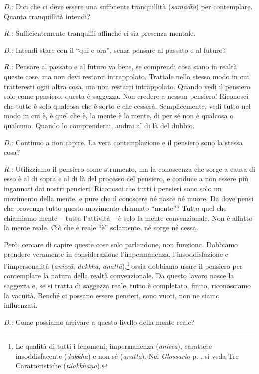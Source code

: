 \emph{D.:} Dici che ci deve essere una sufficiente tranquillità
(\emph{samādhi}) per contemplare. Quanta tranquillità intendi?

\emph{R.:} Sufficientemente tranquilli affinché ci sia presenza mentale.

\emph{D.:} Intendi stare con il ``qui e ora'', senza pensare al passato e al
futuro?

\emph{R.:} Pensare al passato e al futuro va bene, se comprendi cosa siano in
realtà queste cose, ma non devi restarci intrappolato. Trattale nello
stesso modo in cui tratteresti ogni altra cosa, ma non restarci
intrappolato. Quando vedi il pensiero solo come pensiero, questa è
saggezza. Non credere a nessun pensiero! Riconosci che tutto è solo
qualcosa che è sorto e che cesserà. Semplicemente, vedi tutto nel modo
in cui è, è quel che è, la mente è la mente, di per sé non è qualcosa o
qualcuno. Quando lo comprenderai, andrai al di là del dubbio.

\emph{D.:} Continuo a non capire. La vera contemplazione e il pensiero sono la
stessa cosa?

\emph{R.:} Utilizziamo il pensiero come strumento, ma la conoscenza che sorge a
causa di esso è al di sopra e al di là del processo del pensiero, e
conduce a non essere più ingannati dai nostri pensieri. Riconosci che
tutti i pensieri sono solo un movimento della mente, e pure che il
conoscere né nasce né muore. Da dove pensi che provenga tutto questo
movimento chiamato ``mente''? Tutto quel che chiamiamo mente -- tutta
l'attività -- è solo la mente convenzionale. Non è affatto la mente
reale. Ciò che è reale ``è'' solamente, né sorge né cessa.

Però, cercare di capire queste cose solo parlandone, non funziona.
Dobbiamo prendere veramente in considerazione l'impermanenza,
l'insoddisfazione e l'impersonalità (\emph{aniccā}, \emph{dukkha},
\emph{anattā}),\footnote{Le qualità di tutti i fenomeni; impermanenza
  (\emph{anicca}), carattere insoddisfacente (\emph{dukkha}) e non-sé
  (\emph{anatta}). Nel \emph{Glossario} p. \pageref{glossary-tilakkhana}, si veda Tre Caratteristiche
  (\emph{tilakkhaṇa}).} ossia dobbiamo usare il pensiero per contemplare
la natura della realtà convenzionale. Da questo lavoro nasce la saggezza
e, se si tratta di saggezza reale, tutto è completato, finito,
riconosciamo la vacuità. Benché ci possano essere pensieri, sono vuoti,
non ne siamo influenzati.

\emph{D.:} Come possiamo arrivare a questo livello della mente reale?

